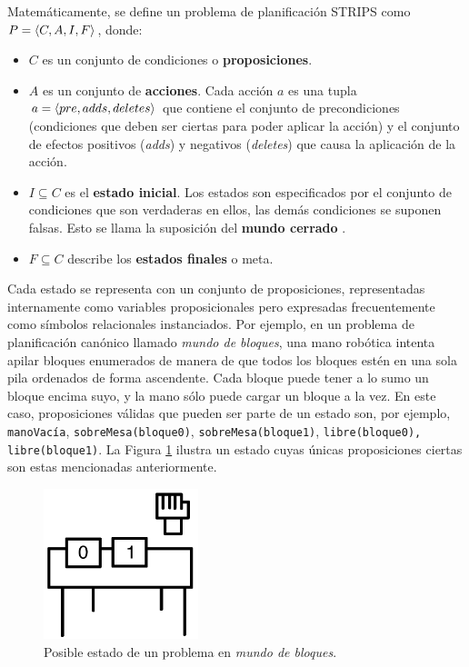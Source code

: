 \begin{definition}
\label{definicion_planificacion}
Matemáticamente, se define un problema de planificación STRIPS como $P = \langle C, A, I,
F \rangle$, donde: 
\begin{itemize} 
\item $C$ es un conjunto de condiciones o \textbf{proposiciones}.
\item $A$ es un conjunto de \textbf{acciones}. Cada acción $a$ es
una tupla $a = \langle pre, adds, deletes \rangle$ que contiene el conjunto de
precondiciones (condiciones que deben ser ciertas para poder aplicar la acción)
y el conjunto de efectos positivos (\textit{adds}) y negativos (\textit{deletes}) que causa la
aplicación de la acción.
\item $I\subseteq C$ es el \textbf{estado inicial}. Los estados son
especificados por el conjunto de condiciones que son verdaderas en ellos, las
demás condiciones se suponen falsas. Esto se llama la suposición del
\textbf{mundo cerrado} \citep{russell:book}.
\item $F\subseteq C$ describe los \textbf{estados finales} o meta.
\end{itemize}
\end{definition}

Cada estado se representa con un conjunto de proposiciones, representadas
internamente como variables proposicionales pero expresadas frecuentemente como
símbolos relacionales instanciados.
Por ejemplo, en un problema de
planificación canónico llamado \textit{mundo de bloques}, una mano
robótica intenta apilar bloques enumerados de manera de que todos los bloques
estén en una sola pila ordenados de forma ascendente. Cada bloque puede tener a
lo sumo un bloque encima suyo, y la mano sólo puede cargar un bloque a la vez.
En este caso, proposiciones válidas que pueden ser parte de un estado son,
por ejemplo,
\texttt{manoVacía}, \texttt{sobreMesa(bloque0)}, \texttt{sobreMesa(bloque1)},
\texttt{libre(bloque0),
\texttt{libre(bloque1)}}.
La Figura \ref{blocksworld_inicial} ilustra un estado cuyas únicas
proposiciones ciertas son estas mencionadas anteriormente.
\begin{figure}[h!]
\centering
\includegraphics[width=0.4\textwidth]{figuras/blocksworld_inicial.png}
\caption[Ejemplo de estado inicial en \textit{mundo de bloques}]{Posible estado de un problema en \textit{mundo de bloques}.}
\label{blocksworld_inicial}
\end{figure}

